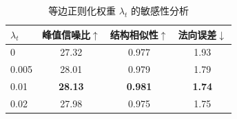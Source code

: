 \begin{table}[t]
    \centering\small
    \caption{等边正则化权重 $\lambda_t$ 的敏感性分析}
    \label{tab:lambda}
    \renewcommand{\arraystretch}{1.2} 
    \setlength{\tabcolsep}{8pt}
    \begin{tabular}{lccc}
        \toprule
        $\lambda_t$ & 峰值信噪比$\uparrow$ & 结构相似性$\uparrow$ & 法向误差$\downarrow$ \\
        \midrule
        0 & 27.32 & 0.977 & 1.93 \\
        0.005 & 28.01 & 0.979 & 1.79 \\
        0.01 & \textbf{28.13} & \textbf{0.981} & \textbf{1.74} \\
        0.02 & 27.98 & 0.975 & 1.75 \\
        \bottomrule
    \end{tabular}
\end{table}
